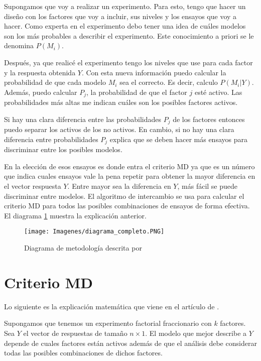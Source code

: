 Supongamos que voy a realizar un experimento. Para esto, tengo que hacer un diseño con los factores que voy a incluir, sus niveles y los ensayos que voy a hacer. Como experta en el experimento debo tener una idea de cuáles modelos son los más probables a describir el experimento. Este conocimiento a priori se le denomina $P(M_i)$. 

Después, ya que realicé el experimento tengo los niveles que use para cada factor y la respuesta obtenida $Y$. Con esta nueva información puedo calcular la probabilidad de que cada modelo $M_i$ sea el correcto. Es decir, calculo $P(M_i | Y)$. Además, puedo calcular $P_j$, la probabilidad de que el factor $j$ esté activo. Las probabilidades más altas me indican cuáles son los posibles factores activos. 

Si hay una clara diferencia entre las probabilidades $P_j$ de los factores entonces puedo separar los activos de los no activos. En cambio, si no hay una clara diferencia entre probabilidades $P_j$ \cite{Meyer} explica que se deben hacer más ensayos para discriminar entre los posibles modelos. 

En la elección de esos ensayos es donde entra el criterio MD ya que es un número que indica cuales ensayos vale la pena repetir para obtener la mayor diferencia en el vector respuesta $Y$. Entre mayor sea la diferencia en $Y$, más fácil se puede discriminar entre modelos. El algoritmo de intercambio se usa para calcular el criterio MD para todos las posibles combinaciones de ensayos de forma efectiva. El diagrama \ref{diagrama_completo} muestra la explicación anterior. 

\begin{figure}[h]
	\begin{center}
		\texttt{[image: Imagenes/diagrama\_completo.PNG]}
		\caption{Diagrama de metodología descrita por \cite{meyer1996}}
		\label{diagrama_completo}
	\end{center}
\end{figure} 



\section{Criterio MD}
Lo siguiente es la explicación matemática que viene en el artículo de \cite{meyer1996}. 

Supongamos que tenemos un experimento factorial fraccionario con $k$ factores. Sea \textbf{$Y$} el vector de respuestas de tamaño $n \times 1$. El modelo que mejor describe a \textbf{$Y$} depende de cuales factores están activos además de que el análisis debe considerar todas las posibles combinaciones de dichos factores. 


